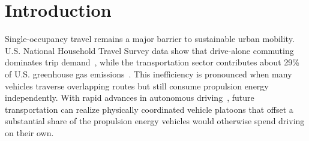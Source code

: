 \documentclass[sigconf]{acmart}
\begin{document}
\section{Introduction}
\label{sec:introduction}
Single-occupancy travel remains a major barrier to sustainable urban mobility. U.S. National Household Travel Survey data show that drive-alone commuting dominates trip demand~\cite{usdot2024}, while the transportation sector contributes about 29\% of U.S. greenhouse gas emissions~\cite{epa2023}. This inefficiency is pronounced when many vehicles traverse overlapping routes but still consume propulsion energy independently. With rapid advances in autonomous driving~\cite{yurtsever2020survey}, future transportation can realize physically coordinated vehicle platoons that offset a substantial share of the propulsion energy vehicles would otherwise spend driving on their own.
\end{document}
